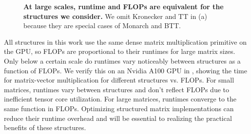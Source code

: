 \documentclass{article}
\theoremstyle{plain}
\theoremstyle{definition}
\theoremstyle{remark}
\begin{document}
\begin{figure}[!h]
\centering
   \caption{
     \textbf{At large scales, runtime and FLOPs are equivalent for the structures we consider.} We omit Kronecker and TT in (a) because they are special cases of Monarch and BTT.
     }
    \label{fig:c10-time}
    \vspace{-4mm}
\end{figure}

All structures in this work use the same dense matrix multiplication primitive on the GPU, so FLOPs are proportional to their runtimes for large matrix sizes. Only below a certain scale do runtimes vary noticeably between structures as a function of FLOPs. We verify this on an Nvidia A100 GPU in , showing the time for matrix-vector multiplication for different structures vs. FLOPs. For small matrices, runtimes vary between structures and don't reflect FLOPs due to inefficient tensor core utilization. For large matrices, runtimes converge to the same function in FLOPs. Optimizing structured matrix implementations can reduce their runtime overhead and will be essential to realizing the practical benefits of these structures.
\end{document}
